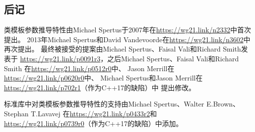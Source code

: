 \subsection{后记}
类模板参数推导特性由Michael Spertus于2007年在\url{https://wg21.link/n2332}中首次提出。
2013年Michael Spertus和David Vandevoorde在\url{https://wg21.link/n3602}中再次提出。
最终被接受的提案由Michael Spertus、Faisal Vali和Richard Smith发表于
\url{https://wg21.link/p0091r3}，之后Michael Spertus、Faisal Vali和Richard Smith
在\url{https://wg21.link/p0512r0}中、
Jason Merrill在\url{https://wg21.link/p0620r0}中、
Michael Spertus和Jason Merrill在\url{https://wg21.link/p702r1}（作为C++17的缺陷）中
提出修改。

标准库中对类模板参数推导特性的支持由Michael Spertus、Walter E.Brown、Stephan T.Lavavej
在\url{https://wg21.link/p0433r2}和\\
\url{https://wg21.link/p0739r0}（作为C++17的缺陷）中添加。